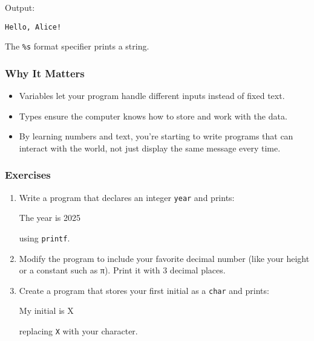 \documentclass[
  letterpaper,
  DIV=11,
  numbers=noendperiod]{scrreprt}
\newenvironment{Shaded}{\begin{snugshade}}{\end{snugshade}}
\newcommand{\ExtensionTok}[1]{\textcolor[rgb]{0.00,0.23,0.31}{#1}}
\newcommand{\NormalTok}[1]{\textcolor[rgb]{0.00,0.23,0.31}{#1}}
\providecommand{\tightlist}{%
  \setlength{\itemsep}{0pt}\setlength{\parskip}{0pt}}
\begin{document}
Output:

\begin{verbatim}
Hello, Alice!
\end{verbatim}

The \texttt{\%s} format specifier prints a string.

\subsubsection{Why It Matters}\label{why-it-matters-5}

\begin{itemize}
\tightlist
\item
  Variables let your program handle different inputs instead of fixed
  text.
\item
  Types ensure the computer knows how to store and work with the data.
\item
  By learning numbers and text, you're starting to write programs that
  can interact with the world, not just display the same message every
  time.
\end{itemize}

\subsubsection{Exercises}\label{exercises-5}

\begin{enumerate}
\def\labelenumi{\arabic{enumi}.}
\item
  Write a program that declares an integer \texttt{year} and prints:

\begin{Shaded}
\begin{Highlighting}[]
\ExtensionTok{The}\NormalTok{ year is 2025}
\end{Highlighting}
\end{Shaded}

  using \texttt{printf}.
\item
  Modify the program to include your favorite decimal number (like your
  height or a constant such as π). Print it with 3 decimal places.
\item
  Create a program that stores your first initial as a \texttt{char} and
  prints:

\begin{Shaded}
\begin{Highlighting}[]
\ExtensionTok{My}\NormalTok{ initial is X}
\end{Highlighting}
\end{Shaded}

  replacing \texttt{X} with your character.
\end{enumerate}
\end{document}
